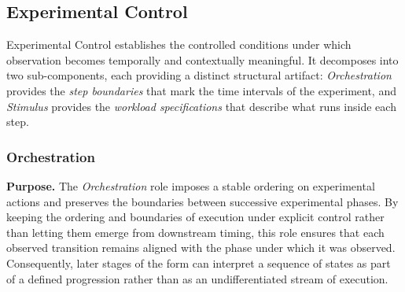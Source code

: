 \subsection{Experimental Control}
Experimental Control establishes the controlled conditions under which observation becomes temporally and contextually meaningful. It decomposes into two sub-components, each providing a distinct structural artifact: \emph{Orchestration} provides the \emph{step boundaries} that mark the time intervals of the experiment, and \emph{Stimulus} provides the \emph{workload specifications} that describe what runs inside each step.

  \subsubsection{Orchestration}
  \textbf{Purpose.} The \emph{Orchestration} role imposes a stable ordering on experimental actions and preserves the boundaries between successive experimental phases. By keeping the ordering and boundaries of execution under explicit control rather than letting them emerge from downstream timing, this role ensures that each observed transition remains aligned with the phase under which it was observed. Consequently, later stages of the form can interpret a sequence of states as part of a defined progression rather than as an undifferentiated stream of execution.

